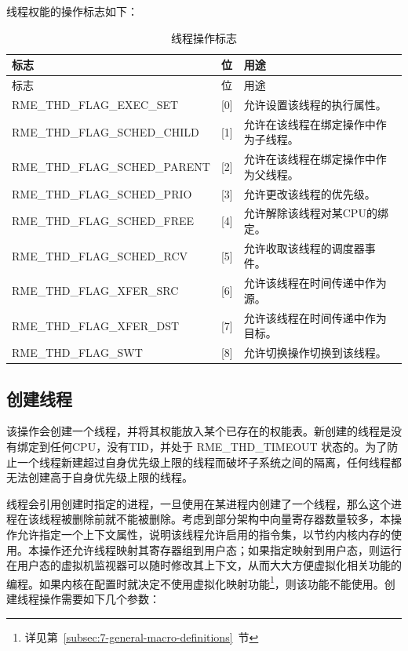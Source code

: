 线程权能的操作标志如下：

\begin{xltabular}{\textwidth}{@{}>{\hsize\raggedright\arraybackslash}X>{\hsize\raggedright\arraybackslash}X>{\hsize\raggedright\arraybackslash}X@{}}
\caption{线程操作标志}\label{tab:4-19-thread-operation-flags}\\
\toprule
标志 & 位 & 用途\tabularnewline
\endfirsthead
\toprule
标志 & 位 & 用途\tabularnewline
\midrule
\endhead
\bottomrule
\endlastfoot
RME\_THD\_FLAG\_EXEC\_SET & {[}0{]} &
允许设置该线程的执行属性。\tabularnewline
RME\_THD\_FLAG\_SCHED\_CHILD & {[}1{]} &
允许在该线程在绑定操作中作为子线程。\tabularnewline
RME\_THD\_FLAG\_SCHED\_PARENT & {[}2{]} &
允许在该线程在绑定操作中作为父线程。\tabularnewline
RME\_THD\_FLAG\_SCHED\_PRIO & {[}3{]} &
允许更改该线程的优先级。\tabularnewline
RME\_THD\_FLAG\_SCHED\_FREE & {[}4{]} &
允许解除该线程对某CPU的绑定。\tabularnewline
RME\_THD\_FLAG\_SCHED\_RCV & {[}5{]} &
允许收取该线程的调度器事件。\tabularnewline
RME\_THD\_FLAG\_XFER\_SRC & {[}6{]} &
允许该线程在时间传递中作为源。\tabularnewline
RME\_THD\_FLAG\_XFER\_DST & {[}7{]} &
允许该线程在时间传递中作为目标。\tabularnewline
RME\_THD\_FLAG\_SWT & {[}8{]} &
允许切换操作切换到该线程。\tabularnewline
\end{xltabular}

\subsection{创建线程}\label{subsec:4-create-a-thread}

该操作会创建一个线程，并将其权能放入某个已存在的权能表。新创建的线程是没有绑定到任何CPU，没有TID，并处于 RME\_THD\_TIMEOUT 状态的。为了防止一个线程新建超过自身优先级上限的线程而破坏子系统之间的隔离，任何线程都无法创建高于自身优先级上限的线程。

线程会引用创建时指定的进程，一旦使用在某进程内创建了一个线程，那么这个进程在该线程被删除前就不能被删除。考虑到部分架构中向量寄存器数量较多，本操作允许指定一个上下文属性，说明该线程允许启用的指令集，以节约内核内存的使用。本操作还允许线程映射其寄存器组到用户态；如果指定映射到用户态，则运行在用户态的虚拟机监视器可以随时修改其上下文，从而大大方便虚拟化相关功能的编程。如果内核在配置时就决定不使用虚拟化映射功能\footnote{详见第~\ref{subsec:7-general-macro-definitions}~节}，则该功能不能使用。创建线程操作需要如下几个参数：

